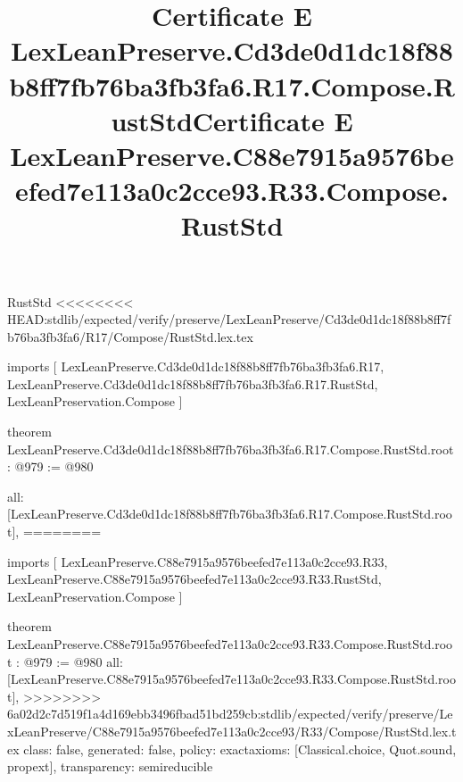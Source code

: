 \begin{lexlean}{RustStd}
<<<<<<<< HEAD:stdlib/expected/verify/preserve/LexLeanPreserve/Cd3de0d1dc18f88b8ff7fb76ba3fb3fa6/R17/Compose/RustStd.lex.tex
\title{Certificate E LexLeanPreserve.Cd3de0d1dc18f88b8ff7fb76ba3fb3fa6.R17.Compose.RustStd}
\begin{coremodule}
imports [
  LexLeanPreserve.Cd3de0d1dc18f88b8ff7fb76ba3fb3fa6.R17,
  LexLeanPreserve.Cd3de0d1dc18f88b8ff7fb76ba3fb3fa6.R17.RustStd,
  LexLeanPreservation.Compose
]

theorem LexLeanPreserve.Cd3de0d1dc18f88b8ff7fb76ba3fb3fa6.R17.Compose.RustStd.root : @979 := @980 {
  all: [LexLeanPreserve.Cd3de0d1dc18f88b8ff7fb76ba3fb3fa6.R17.Compose.RustStd.root],
========
\title{Certificate E LexLeanPreserve.C88e7915a9576beefed7e113a0c2cce93.R33.Compose.RustStd}
\begin{coremodule}
imports [
  LexLeanPreserve.C88e7915a9576beefed7e113a0c2cce93.R33,
  LexLeanPreserve.C88e7915a9576beefed7e113a0c2cce93.R33.RustStd,
  LexLeanPreservation.Compose
]

theorem LexLeanPreserve.C88e7915a9576beefed7e113a0c2cce93.R33.Compose.RustStd.root : @979 := @980 {
  all: [LexLeanPreserve.C88e7915a9576beefed7e113a0c2cce93.R33.Compose.RustStd.root],
>>>>>>>> 6a02d2c7d519f1a4d169ebb3496fbad51bd259cb:stdlib/expected/verify/preserve/LexLeanPreserve/C88e7915a9576beefed7e113a0c2cce93/R33/Compose/RustStd.lex.tex
  class: false,
  generated: false,
  policy: exact{axioms: [Classical.choice, Quot.sound, propext]},
  transparency: semireducible
}


\end{coremodule}}
\end{coremodule}
\end{lexlean}
